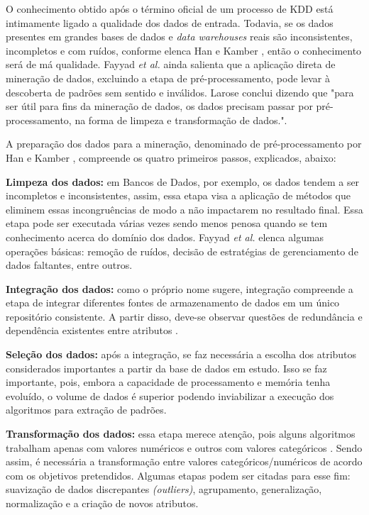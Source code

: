 \documentclass[tg]{mdtufsm}
\begin{document}
O conhecimento obtido após o término oficial de um processo de KDD está intimamente ligado a qualidade dos dados de entrada. Todavia, se os dados presentes em grandes bases de dados e \textit{data warehouses} reais são inconsistentes, incompletos e com ruídos, conforme elenca Han e Kamber \citeyearpar{Han-kamber2nd}, então o conhecimento será de má qualidade. Fayyad \textit{et al.} \citeyear{fayyad} ainda salienta que a aplicação direta de mineração de dados, excluindo a etapa de pré-processamento, pode levar à descoberta de padrões sem sentido e inválidos. Larose \citeyearpar{larose2005} conclui dizendo que "para ser útil para fins da mineração de dados, os dados precisam passar por pré-processamento, na forma de limpeza e transformação de dados.".

A preparação dos dados para a mineração, denominado de pré-processamento por Han e Kamber \citeyearpar{Han-kamber2nd}, compreende os quatro primeiros passos, explicados, abaixo:

\textbf{Limpeza dos dados:} em Bancos de Dados, por exemplo, os dados tendem a ser incompletos e inconsistentes, assim, essa etapa visa a aplicação de métodos que eliminem essas incongruências de modo a não impactarem no resultado final. Essa etapa pode ser executada várias vezes sendo menos penosa quando se tem conhecimento acerca do domínio dos dados. Fayyad \textit{et al.} \citeyearpar{fayyad} elenca algumas operações básicas: remoção de ruídos, decisão de estratégias de gerenciamento de dados faltantes, entre outros. 

\textbf{Integração dos dados:} como o próprio nome sugere, integração compreende a etapa de integrar diferentes fontes de armazenamento de dados em um único repositório consistente. A partir disso, deve-se observar questões de redundância e dependência existentes entre atributos \cite{cassio-joao}.

\textbf{Seleção dos dados:} após a integração, se faz necessária a escolha dos atributos considerados importantes a partir da base de dados em estudo. Isso se faz importante, pois, embora a capacidade de processamento e memória tenha evoluído, o volume de dados é superior podendo inviabilizar a execução dos algoritmos para extração de padrões. \cite{rezende2003mineraccao}

\textbf{Transformação dos dados:} essa etapa merece atenção, pois alguns algoritmos trabalham apenas com valores numéricos e outros com valores categóricos \cite{cassio-joao}. Sendo assim, é necessária a transformação entre valores categóricos/numéricos de acordo com os objetivos pretendidos. Algumas etapas podem ser citadas para esse fim: suavização de dados discrepantes \textit{(outliers)}, agrupamento, generalização, normalização e a criação de novos atributos.
\end{document}
